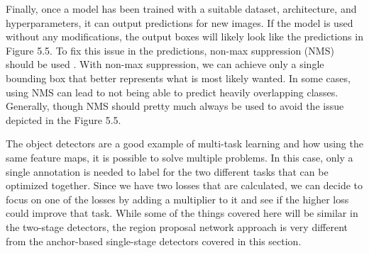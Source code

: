 Finally, once a model has been trained with a suitable dataset, architecture, and hyperparameters, it can output predictions for new images.
If the model is used without any modifications, the output boxes will likely look like the predictions in Figure 5.5.
To fix this issue in the predictions, non-max suppression (NMS) should be used \citep{nms}.
With non-max suppression, we can achieve only a single bounding box that better represents what is most likely wanted.
In some cases, using NMS can lead to not being able to predict heavily overlapping classes.
Generally, though NMS should pretty much always be used to avoid the issue depicted in the Figure 5.5.

The object detectors are a good example of multi-task learning and how using the same feature maps, it is possible to solve multiple problems.
In this case, only a single annotation is needed to label for the two different tasks that can be optimized together.
Since we have two losses that are calculated, we can decide to focus on one of the losses by adding a multiplier to it and see if the higher loss could improve that task.
While some of the things covered here will be similar in the two-stage detectors, the region proposal network approach is very different from the anchor-based single-stage detectors covered in this section.
